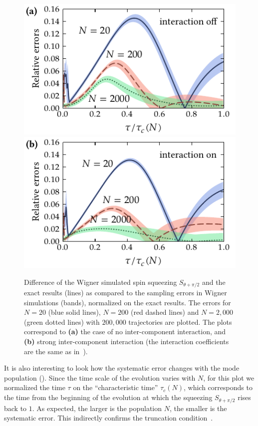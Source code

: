 \begin{figure}
    \centerline{%
    \includegraphics{figures_generated/exact/squeezing_nocc_N_err.pdf}%
    \includegraphics{figures_generated/exact/squeezing_cc_N_err.pdf}}

    \caption[Dependence of systematic errors in Wigner simulated spin squeezing on the particle number]{
    Difference of the Wigner simulated spin squeezing $S_{\theta+\pi/2}$ and the exact results (lines) as compared to the sampling errors in Wigner simulations (bands), normalized on the exact results.
    The errors for $N=20$ (blue solid lines), $N=200$ (red dashed lines) and $N=2,000$ (green dotted lines) with $200,000$ trajectories are plotted.
    The plots correspond to \textbf{(a)} the case of no inter-component interaction, and \textbf{(b)} strong inter-component interaction (the interaction coefficients are the same as in~).}%

    \label{fig:exact:squeezing-N-error-comparison}
\end{figure}

It is also interesting to look how the systematic error changes with the mode population ().
Since the time scale of the evolution varies with $N$, for this plot we normalized the time $\tau$ on the ``characteristic time'' $\tau_c(N)$, which corresponds to the time from the beginning of the evolution at which the squeezing $S_{\theta+\pi/2}$ rises back to $1$.
As expected, the larger is the population $N$, the smaller is the systematic error.
This indirectly confirms the truncation condition~.

